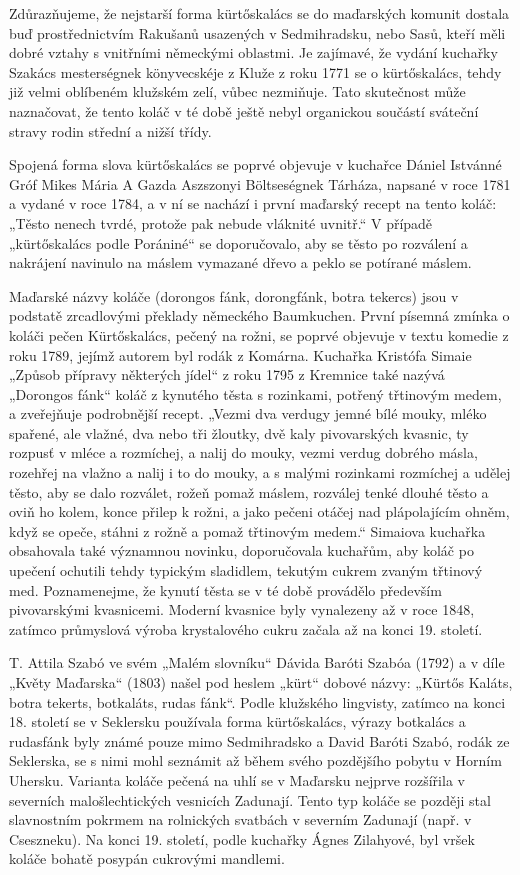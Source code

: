 Zdůrazňujeme, že nejstarší forma kürtőskalács se do maďarských komunit
dostala buď prostřednictvím Rakušanů usazených v Sedmihradsku, nebo
Sasů, kteří měli dobré vztahy s vnitřními německými oblastmi. Je
zajímavé, že vydání kuchařky Szakács mesterségnek könyvecskéje z Kluže z
roku 1771 se o kürtőskalács, tehdy již velmi oblíbeném klužském zelí,
vůbec nezmiňuje. Tato skutečnost může naznačovat, že tento koláč v té
době ještě nebyl organickou součástí sváteční stravy rodin střední a
nižší třídy.

Spojená forma slova kürtőskalács se poprvé objevuje v kuchařce Dániel
Istvánné Gróf Mikes Mária A Gazda Aszszonyi Böltseségnek Tárháza,
napsané v roce 1781 a vydané v roce 1784, a v ní se nachází i první
maďarský recept na tento koláč: „Těsto nenech tvrdé, protože pak nebude
vláknité uvnitř.`` V případě „kürtőskalács podle Porániné`` se
doporučovalo, aby se těsto po rozválení a nakrájení navinulo na máslem
vymazané dřevo a peklo se potírané máslem.

Maďarské názvy koláče (dorongos fánk, dorongfánk, botra tekercs) jsou v
podstatě zrcadlovými překlady německého Baumkuchen. První písemná zmínka
o koláči pečen Kürtőskalács, pečený na rožni, se poprvé objevuje v textu
komedie z roku 1789, jejímž autorem byl rodák z Komárna. Kuchařka
Kristófa Simaie „Způsob přípravy některých jídel`` z roku 1795 z
Kremnice také nazývá „Dorongos fánk`` koláč z kynutého těsta s
rozinkami, potřený třtinovým medem, a zveřejňuje podrobnější recept.
„Vezmi dva verdugy jemné bílé mouky, mléko spařené, ale vlažné, dva nebo
tři žloutky, dvě kaly pivovarských kvasnic, ty rozpusť v mléce a
rozmíchej, a nalij do mouky, vezmi verdug dobrého másla, rozehřej na
vlažno a nalij i to do mouky, a s malými rozinkami rozmíchej a udělej
těsto, aby se dalo rozválet, rožeň pomaž máslem, rozválej tenké dlouhé
těsto a oviň ho kolem, konce přilep k rožni, a jako pečeni otáčej nad
plápolajícím ohněm, když se opeče, stáhni z rožně a pomaž třtinovým
medem.`` Simaiova kuchařka obsahovala také významnou novinku,
doporučovala kuchařům, aby koláč po upečení ochutili tehdy typickým
sladidlem, tekutým cukrem zvaným třtinový med. Poznamenejme, že kynutí
těsta se v té době provádělo především pivovarskými kvasnicemi. Moderní
kvasnice byly vynalezeny až v roce 1848, zatímco průmyslová výroba
krystalového cukru začala až na konci 19. století.

T. Attila Szabó ve svém „Malém slovníku`` Dávida Baróti Szabóa (1792) a
v díle „Květy Maďarska`` (1803) našel pod heslem „kürt`` dobové názvy:
„Kürtős Kaláts, botra tekerts, botkaláts, rudas fánk``. Podle klužského
lingvisty, zatímco na konci 18. století se v Seklersku používala forma
kürtőskalács, výrazy botkalács a rudasfánk byly známé pouze mimo
Sedmihradsko a David Baróti Szabó, rodák ze Seklerska, se s nimi mohl
seznámit až během svého pozdějšího pobytu v Horním Uhersku. Varianta
koláče pečená na uhlí se v Maďarsku nejprve rozšířila v severních
malošlechtických vesnicích Zadunají. Tento typ koláče se později stal
slavnostním pokrmem na rolnických svatbách v severním Zadunají (např. v
Cseszneku). Na konci 19. století, podle kuchařky Ágnes Zilahyové, byl
vršek koláče bohatě posypán cukrovými mandlemi.

